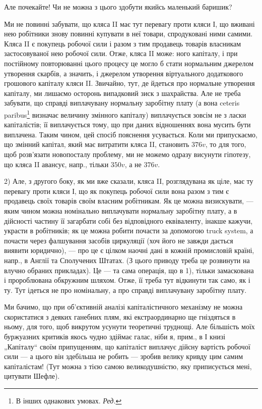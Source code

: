 Але почекайте! Чи не можна з цього здобути якийсь маленький
баришик?

Ми не повинні забувати, що кляса II має тут перевагу проти кляси І,
що вживані нею робітники знову повинні купувати в неї товари, спродуковані
ними самими. Кляса II є покупець робочої сили і разом з тим
продавець товарів власникам застосовуваної нею робочої сили. Отже,
кляса II може:
ного капіталу, і при постійному повторюванні цього процесу це могло б
стати нормальним джерелом утворення скарбів, а значить, і джерелом
утворення віртуального додаткового грошового капіталу кляси II. Звичайно,
тут, де йдеться про нормальне утворення капіталу, ми лишаємо
осторонь випадковий зиск з шахрайства. Але не треба забувати, що
справді виплачувану нормальну заробітну плату (а вона ceteris paribus\footnote*{
В інших однакових умовах. \emph{Ред.}
}
визначає величину змінного капіталу) виплачується зовсім не з ласки
капіталістів; її виплачується тому, що при даних відношеннях вона
мусить бути виплачена. Таким чином, цей спосіб пояснення усувається.
Коли ми припускаємо, що змінний капітал, який має витратити кляса II,
становить $376 v$, то для того, щоб розв’язати новопосталу проблему, ми
не можемо одразу висунути гіпотезу, що кляса II авансує, напр., тільки
$350 v$, а не $376 v$.

2) Але, з другого боку, як ми вже сказали, кляса II, розглядувана як
ціле, має ту перевагу проти кляси І, що як покупець робочої сили вона
разом з тим є продавець своїх товарів своїм власним робітникам. Як це
можна визискувати, — яким чином можна номінально виплачувати нормальну
заробітну плату, а в дійсності частину її загарбати собі без відповідного
еквіваленту, інакше кажучи, украсти в робітників; як це можна робити
почасти за допомогою truck system, а почасти через фалшування засобів
циркуляції (хоч його не завжди дається виявити юридично), — про
це є цілком наочні дані в кожній промисловій країні, напр., в Англії та
Сполучених Штатах. (З цього приводу треба це розвинути на влучно
обраних прикладах). Це — та сама операція, що в 1), тільки замаскована
і пророблювана обкружним шляхом. Отже, її треба тут відкинути так
само, як і ту. Тут ідеться не про номінальну, а про справді виплачувану
заробітну плату.

Ми бачимо, що при об’єктивній аналізі капіталістичного механізму не
можна скористатися з деяких ганебних плям, які екстраординарно ще
гніздяться в ньому, для того, щоб викрутом усунути теоретичні труднощі.
Але більшість моїх буржуазних критиків якось чудно здіймає галас, ніби
я, прим., в І книзі „Капіталу“ своїм припущенням, що капіталіст виплачує
дійсну вартість робочої сили — а цього він здебільша не робить —
зробив велику кривду цим самим капіталістам! (Тут можна з тією самою
великодушністю, яку приписується мені, цитувати Шефле).

